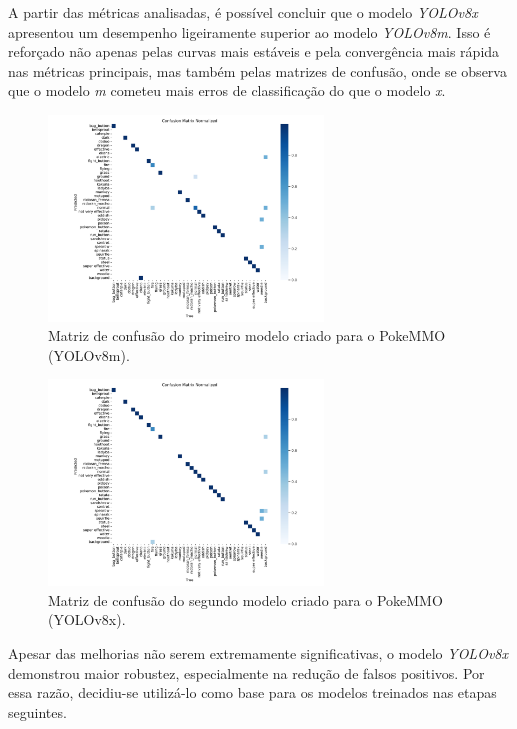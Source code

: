 A partir das métricas analisadas, é possível concluir que o modelo \textit{YOLOv8x} apresentou um desempenho ligeiramente superior ao modelo \textit{YOLOv8m}. Isso é reforçado não apenas pelas curvas mais estáveis e pela convergência mais rápida nas métricas principais, mas também pelas matrizes de confusão, onde se observa que o modelo \textit{m} cometeu mais erros de classificação do que o modelo \textit{x}.

\begin{figure}[h]
    \centering
    \includegraphics[width=0.65\textwidth]{imagens/confusion_matrix_normalized_modelom.png}
    \caption{Matriz de confusão do primeiro modelo criado para o PokeMMO (YOLOv8m).}
    \label{fig:confusion_matrix_modelom}
\end{figure}

\begin{figure}[h]
    \centering
    \includegraphics[width=0.65\textwidth]{imagens/confusion_matrix_normalized_modelox.png}
    \caption{Matriz de confusão do segundo modelo criado para o PokeMMO (YOLOv8x).}
    \label{fig:confusion_matrix_modelox}
\end{figure}

Apesar das melhorias não serem extremamente significativas, o modelo \textit{YOLOv8x} demonstrou maior robustez, especialmente na redução de falsos positivos. Por essa razão, decidiu-se utilizá-lo como base para os modelos treinados nas etapas seguintes.



